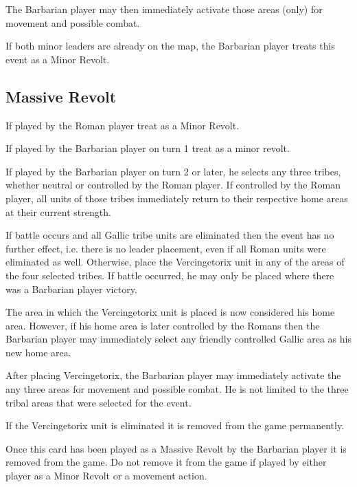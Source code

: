 The Barbarian player may then immediately activate those areas (only) for movement and possible combat.

If both minor leaders are already on the map, the Barbarian player treats this event as a Minor Revolt.

\subsection{Massive Revolt}
If played by the Roman player treat as a Minor Revolt.

If played by the Barbarian player on turn 1 treat as a minor revolt.

If played by the Barbarian player on turn 2 or later, he selects any three tribes, whether neutral or controlled by the Roman player. If controlled by the Roman player, all units of those tribes immediately return to their respective home areas at their current strength.

If battle occurs and all Gallic tribe units are eliminated then the event has no further effect, i.e. there is no leader placement, even if all Roman units were eliminated as well. Otherwise, place the Vercingetorix unit in any of the areas of the four selected tribes. If battle occurred, he may only be placed where there was a Barbarian player victory.

The area in which the Vercingetorix unit is placed is now considered his home area. However, if his home area is later controlled by the Romans then the Barbarian player may immediately select any friendly controlled
Gallic area as his new home area.

After placing Vercingetorix, the Barbarian player may immediately activate the any three areas for movement and possible combat. He is not limited to the three tribal areas that were selected for the event. 

If the Vercingetorix unit is eliminated it is removed from the game permanently.

Once this card has been played as a Massive Revolt by the Barbarian player it is removed from the game. Do not remove it from the game if played by either player as a Minor Revolt or a movement action.
